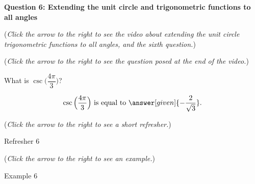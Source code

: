 \documentclass{ximera}
\begin{document}
\textbf{Question 6: Extending the unit circle and trigonometric
functions to all angles}
\begin{question}
\begin{flushright}
{\color{blue}(\emph{Click the arrow to the right to see the
video about extending the unit circle trigonometric functions to all
angles, and the sixth question.})}
\end{flushright}
\begin{center}
\begin{expandable}
\begin{flushright}
{\color{blue}(\emph{Click the arrow to the right to see the question
posed at the end of the video.})}
\end{flushright}
\begin{expandable}
What is $\csc\Big(\dfrac{4\pi}{3}\Big)$?
\begin{prompt}
\[
\csc\Big( \dfrac{4\pi}{3}\Big) \text{ is equal to } \answer[given]{-\frac{2}{\sqrt{3}}}.
\]
\end{prompt}
\begin{flushright}
{\color{blue}(\emph{Click the arrow to the right to see a short refresher.})}
\end{flushright}
\begin{expandable}
\begin{center}
Refresher 6
\end{center}
\end{expandable}
\begin{flushright}
{\color{blue}(\emph{Click the arrow to the right to see an example.})}
\end{flushright}
\begin{expandable}
\begin{center}
Example 6
\end{center}
\end{expandable}
\end{expandable}
\end{expandable}
\end{center}
\end{question}
\end{document}
